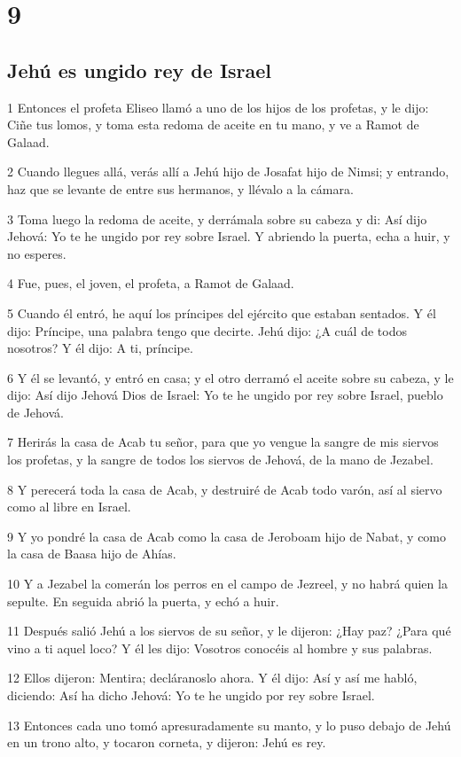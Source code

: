 \chapter{9}

\section*{Jehú es ungido rey de Israel}

\par 1 Entonces el profeta Eliseo llamó a uno de los hijos de los profetas, y le dijo: Ciñe tus lomos, y toma esta redoma de aceite en tu mano, y ve a Ramot de Galaad.
\par 2 Cuando llegues allá, verás allí a Jehú hijo de Josafat hijo de Nimsi; y entrando, haz que se levante de entre sus hermanos, y llévalo a la cámara.
\par 3 Toma luego la redoma de aceite, y derrámala sobre su cabeza y di: Así dijo Jehová: Yo te he ungido por rey sobre Israel. Y abriendo la puerta, echa a huir, y no esperes.
\par 4 Fue, pues, el joven, el profeta, a Ramot de Galaad.
\par 5 Cuando él entró, he aquí los príncipes del ejército que estaban sentados. Y él dijo: Príncipe, una palabra tengo que decirte. Jehú dijo: ¿A cuál de todos nosotros? Y él dijo: A ti, príncipe.
\par 6 Y él se levantó, y entró en casa; y el otro derramó el aceite sobre su cabeza, y le dijo: Así dijo Jehová Dios de Israel: Yo te he ungido por rey sobre Israel, pueblo de Jehová. 
\par 7 Herirás la casa de Acab tu señor, para que yo vengue la sangre de mis siervos los profetas, y la sangre de todos los siervos de Jehová, de la mano de Jezabel.
\par 8 Y perecerá toda la casa de Acab, y destruiré de Acab todo varón, así al siervo como al libre en Israel.
\par 9 Y yo pondré la casa de Acab como la casa de Jeroboam hijo de Nabat, y como la casa de Baasa hijo de Ahías.
\par 10 Y a Jezabel la comerán los perros en el campo de Jezreel, y no habrá quien la sepulte. En seguida abrió la puerta, y echó a huir.
\par 11 Después salió Jehú a los siervos de su señor, y le dijeron: ¿Hay paz? ¿Para qué vino a ti aquel loco? Y él les dijo: Vosotros conocéis al hombre y sus palabras.
\par 12 Ellos dijeron: Mentira; decláranoslo ahora. Y él dijo: Así y así me habló, diciendo: Así ha dicho Jehová: Yo te he ungido por rey sobre Israel.
\par 13 Entonces cada uno tomó apresuradamente su manto, y lo puso debajo de Jehú en un trono alto, y tocaron corneta, y dijeron: Jehú es rey.

